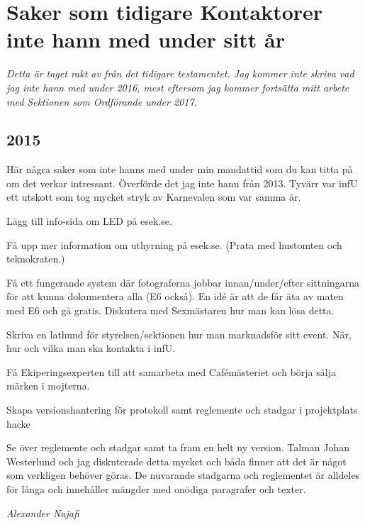 \documentclass[10pt]{article}
\begin{document}
\section{Saker som tidigare Kontaktorer inte hann med under sitt år}
\emph{Detta är taget rakt av från det tidigare testamentet. Jag kommer inte skriva vad jag inte hann med under 2016, mest eftersom jag kommer fortsätta mitt arbete med Sektionen som Ordförande under 2017.}

\subsection{2015}
Här några saker som inte hanns med under min mandattid som du kan titta på om det verkar intressant. Överförde det jag inte hann från 2013. Tyvärr var infU ett utskott som tog mycket stryk av Karnevalen som var samma år.
\begin{tightdashlist}
    \item Lägg till info-sida om LED på esek.se.
    \item Få upp mer information om uthyrning på esek.se. (Prata med hustomten och teknokraten.)
    \item Få ett fungerande system där fotograferna jobbar innan/under/efter sittningarna för att kunna dokumentera alla (E6 också). En idé är att de får äta av maten med E6 och gå gratis. Diskutera med Sexmästaren hur man kan lösa detta.
    \item Skriva en lathund för styrelsen/sektionen hur man marknadsför sitt event. När, hur och vilka man ska kontakta i infU.
    \item Få Ekiperingsexperten till att samarbeta med Cafémästeriet och börja sälja märken i mojterna.
    \item Skapa versionshantering för protokoll samt reglemente och stadgar i projektplats hacke
    \item Se över reglemente och stadgar samt ta fram en helt ny version. Talman Johan Westerlund och jag diskuterade detta mycket och båda finner att det är något som verkligen behöver göras. De nuvarande stadgarna och reglementet är alldeles för långa och innehåller mängder med onödiga paragrafer och texter.
\end{tightdashlist}

\emph{Alexander Najafi}
\end{document}
